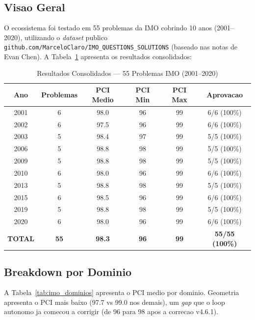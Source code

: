 \documentclass[5p]{elsarticle}
\newcommand{\tabfootnotesize}{\fontsize{9}{11}\selectfont}
\begin{document}
\subsection{Visao Geral}

O ecossistema foi testado em 55 problemas da IMO cobrindo 10 anos (2001--2020),
utilizando o \textit{dataset} publico \texttt{github.com/MarceloClaro/IMO\_QUESTIONS\_SOLUTIONS}
(baseado nas notas de Evan Chen). A Tabela~\ref{tab:imo_total} apresenta os
resultados consolidados:

\begin{table}[H]
\centering
\caption{Resultados Consolidados — 55 Problemas IMO (2001--2020)}
\label{tab:imo_total}
\tabfootnotesize
\begin{tabular}{c c c c c c}
\toprule
\textbf{Ano} & \textbf{Problemas} & \textbf{PCI Medio} & \textbf{PCI Min} & \textbf{PCI Max} & \textbf{Aprovacao}\\
\midrule
2001 & 6 & 98.0 & 96 & 99 & 6/6 (100\%)\\
2002 & 6 & 97.5 & 96 & 99 & 6/6 (100\%)\\
2003 & 5 & 98.4 & 97 & 99 & 5/5 (100\%)\\
2006 & 5 & 98.8 & 98 & 99 & 5/5 (100\%)\\
2009 & 5 & 98.8 & 98 & 99 & 5/5 (100\%)\\
2010 & 6 & 98.0 & 96 & 99 & 6/6 (100\%)\\
2013 & 5 & 98.8 & 98 & 99 & 5/5 (100\%)\\
2015 & 6 & 98.5 & 96 & 99 & 6/6 (100\%)\\
2019 & 5 & 98.8 & 98 & 99 & 5/5 (100\%)\\
2020 & 6 & 98.0 & 96 & 99 & 6/6 (100\%)\\
\midrule
\textbf{TOTAL} & \textbf{55} & \textbf{98.3} & \textbf{96} & \textbf{99} & \textbf{55/55 (100\%)}\\
\bottomrule
\end{tabular}
\end{table}

\subsection{Breakdown por Dominio}

A Tabela~\ref{tab:imo_dominios} apresenta o PCI medio por dominio. Geometria
apresenta o PCI mais baixo (97.7 vs 99.0 nos demais), um \textit{gap} que o
loop autonomo ja comecou a corrigir (de 96 para 98 apos a correcao v4.6.1).
\end{document}
